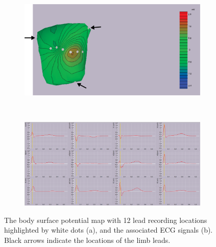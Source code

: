 \documentclass[12pt]{article}
\begin{document}
\begin{figure}[H]
	\begin{subfigure}{.95\textwidth}
		\centering
		\includegraphics[width=.95\linewidth]{Figures/2_1_bsp.png}
		\caption{}
		
	\end{subfigure}%
	\\
	\begin{subfigure}{.95\textwidth}
		\centering
		\includegraphics[width=.95\linewidth]{Figures/2_1_ecg.png}
		\caption{}
		
	\end{subfigure}
	\caption{The body surface potential map with 12 lead recording locations highlighted by white dots (a), and the associated ECG signals (b). Black arrows indicate the locations of the limb leads.}
	\label{2_1}
\end{figure}
\end{document}
